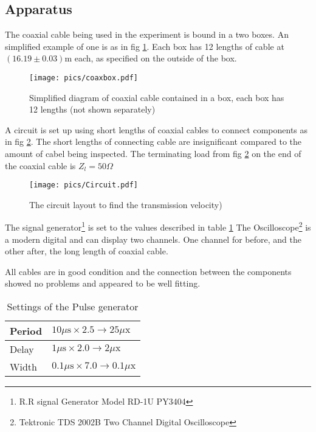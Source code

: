 \subsection{Apparatus}
The coaxial cable being used in the experiment is 
bound in a two boxes. An simplified example of one is as in fig \ref{fig:coaxbox}.
Each box has 12 lengths of cable at $(16.19 \pm 0.03)$m each, as specified on the outside
of the box.

\begin{figure}[htbp]
\centering
\texttt{[image: pics/coaxbox.pdf]}
\caption{Simplified diagram of coaxial cable contained in a box, each box has
 12 lengths (not shown separately) \label{fig:coaxbox}}
\end{figure}

A circuit is set up using short lengths of coaxial cables to connect components
as in fig \ref{fig:circuit}. The short lengths of connecting cable are insignificant
compared to the amount of cabel being inspected. The terminating load from fig \ref{fig:circuit} on the end of the 
coaxial cable is $Z_l = 50\Omega$

\begin{figure}[htbp]
\centering
\texttt{[image: pics/Circuit.pdf]}
\caption{The circuit layout to find the transmission velocity) \label{fig:circuit}}
\end{figure}

The signal generator\footnote{R.R signal Generator Model RD-1U PY3404}
 is set to the values described in table \ref{tab:pulse}
The Oscilloscope\footnote{Tektronic TDS 2002B Two Channel Digital Oscilloscope}
 is a modern digital and can display two channels. One channel for
before, and the other after, the long length of coaxial cable.

All cables are in good condition and the connection between the components showed
no problems and appeared to be well fitting.

\begin{table}[htbp]
\centering
\begin{tabular}{l|l}
Period & $10\mu\text{s} \times 2.5 \rightarrow 25\mu\text{x}$  \\
\hline Delay & $1\mu\text{s} \times 2.0 \rightarrow 2\mu\text{x}$ \\
\hline Width & $0.1\mu\text{s} \times 7.0 \rightarrow 0.1\mu\text{x}$
\end{tabular}
\caption{Settings of the Pulse generator \label{tab:pulse}}
\end{table}
